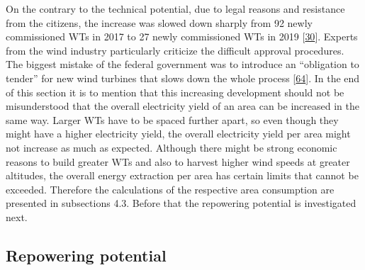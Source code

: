 \documentclass[a4paper,11pt]{article}
\begin{document}
On the contrary to the technical potential, due to legal reasons and resistance from the citizens, the increase was slowed down sharply from 92 newly commissioned WTs in 2017 to 27 newly commissioned WTs in 2019 {[}\protect\hyperlink{ref-EnergieagenturRheinlandPfalz.2019}{30}{]}. Experts from the wind industry particularly criticize the difficult approval procedures. The biggest mistake of the federal government was to introduce an ``obligation to tender'' for new wind turbines that slows down the whole process {[}\protect\hyperlink{ref-NickSchader.2021}{64}{]}. In the end of this section it is to mention that this increasing development should not be misunderstood that the overall electricity yield of an area can be increased in the same way. Larger WTs have to be spaced further apart, so even though they might have a higher electricity yield, the overall electricity yield per area might not increase as much as expected. Although there might be strong economic reasons to build greater WTs and also to harvest higher wind speeds at greater altitudes, the overall energy extraction per area has certain limits that cannot be exceeded. Therefore the calculations of the respective area consumption are presented in subsections 4.3. Before that the repowering potential is investigated next.

\hypertarget{repowering-potential}{%
\subsection{Repowering potential}\label{repowering-potential}}
\end{document}
